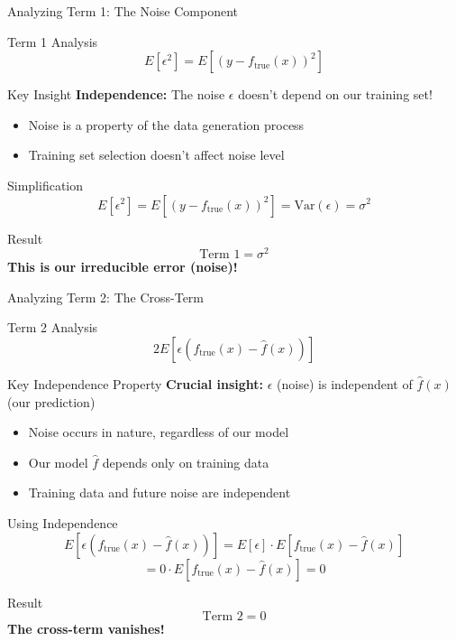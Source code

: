 \documentclass[10pt]{beamer}
\begin{document}
\begin{frame}{Analyzing Term 1: The Noise Component}
\begin{definitionbox}{Term 1 Analysis}
$$E[\epsilon^2] = E[(y - f_{\text{true}}(x))^2]$$
\end{definitionbox}

\begin{keypointsbox}{Key Insight}
\textbf{Independence:} The noise $\epsilon$ doesn't depend on our training set!
\begin{itemize}
\item Noise is a property of the data generation process
\item Training set selection doesn't affect noise level
\end{itemize}
\end{keypointsbox}

\begin{examplebox}{Simplification}
$$E[\epsilon^2] = E[(y - f_{\text{true}}(x))^2] = \text{Var}(\epsilon) = \sigma^2$$
\end{examplebox}

\begin{alertbox}{Result}
$$\boxed{\text{Term 1} = \sigma^2}$$
\textbf{This is our irreducible error (noise)!}
\end{alertbox}
\end{frame}

\begin{frame}{Analyzing Term 2: The Cross-Term}
\begin{definitionbox}{Term 2 Analysis}
$$2E[\epsilon(f_{\text{true}}(x) - \hat{f}(x))]$$
\end{definitionbox}

\begin{keypointsbox}{Key Independence Property}
\textbf{Crucial insight:} $\epsilon$ (noise) is independent of $\hat{f}(x)$ (our prediction)
\begin{itemize}
\item Noise occurs in nature, regardless of our model
\item Our model $\hat{f}$ depends only on training data
\item Training data and future noise are independent
\end{itemize}
\end{keypointsbox}

\begin{examplebox}{Using Independence}
$$E[\epsilon(f_{\text{true}}(x) - \hat{f}(x))] = E[\epsilon] \cdot E[f_{\text{true}}(x) - \hat{f}(x)]$$
$$= 0 \cdot E[f_{\text{true}}(x) - \hat{f}(x)] = 0$$
\end{examplebox}

\begin{alertbox}{Result}
$$\boxed{\text{Term 2} = 0}$$
\textbf{The cross-term vanishes!}
\end{alertbox}
\end{frame}
\end{document}

